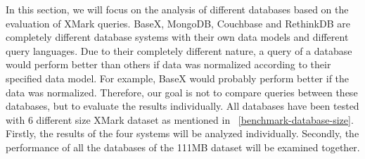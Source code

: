 In this section, we will focus on the analysis of different databases based on the  evaluation of XMark queries. BaseX, MongoDB, Couchbase and RethinkDB are completely different database systems with their own data models and different query languages.  Due to their completely different nature, a query of a database would perform better than others if data was normalized according to their specified data model. For example, BaseX would probably perform better if the data was normalized. Therefore, our goal is not to compare queries between these databases, but to evaluate the results individually.  All databases have been tested with 6 different size XMark dataset as mentioned in ~\ref{benchmark-database-size}. Firstly, the results  of the four systems will be analyzed individually. Secondly, the performance of all the databases of the 111MB dataset will be examined together.

